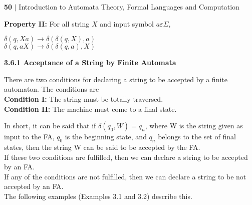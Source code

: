 \documentclass{article}
\begin{document}
\newpage
 \begin{flushleft}
    \textbf{50}\hspace*{0.1cm} \textbf{$|$} \hspace*{0.1cm} Introduction to Automata Theory, Formal Languages and Computation
  \end{flushleft}
\vspace*{0.3cm}

 \textbf{Property II:} For all string $X$ and input symbol $a \varepsilon \Sigma$,\\
\begin{center}
  $\delta(q, Xa) \rightarrow \delta(\delta(q, X), a)$ \\
  $\delta(q, aX) \rightarrow \delta(\delta(q, a), X)$ \\
\end{center}
\vspace*{0.1cm}

\large{
\textbf{3.6.1 Acceptance of a String by Finite Automata}\\
}
\vspace*{0.2cm}


There are two conditions for declaring a string to be accepted by a finite automaton. The conditions are\\

\vspace*{0.2cm}
\hspace*{0.5cm} \textbf{Condition I:} The string must be totally traversed.\\

\hspace*{0.5cm} \textbf{Condition II:} The machine must come to a final state.\\

\vspace*{0.2cm}

In short, it can be said that if $\delta(q_{0}, W) = q_{n}$, where W is the string given as input to the FA, $q_{0}$ is the beginning
state, and $q_{n}$ belongs to the set of final states, then the string W can be said to be accepted by the FA.\\
\hspace*{0.5cm} If these two conditions are fulfilled, then we can declare a string to be accepted by an FA.\\


\hspace*{0.5cm} If any of the conditions are not fulfilled, then we can declare a string to be not accepted by an FA.\\
\hspace*{0.5cm} The following examples (Examples 3.1 and 3.2) describe this.\\
\end{document}
